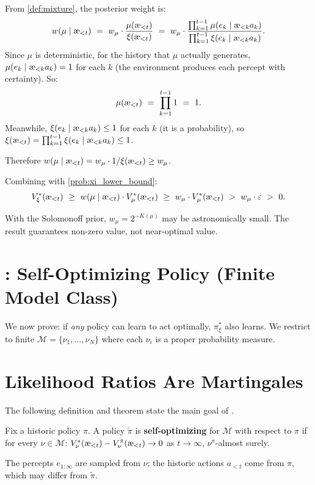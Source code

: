 \documentclass[fontsize=11pt, parskip=half]{scrartcl}
\newcommand{\cM}{\mathcal{M}}
\newcommand{\aes}{\textnormal{\ae}}
\begin{document}
\begin{solution}
From \cref{def:mixture}, the posterior weight is:
\[
    w(\mu \mid \aes_{<t})
    ~=~ w_\mu \cdot \frac{\mu(\aes_{<t})}{\xi(\aes_{<t})}
    ~=~ w_\mu \cdot \frac{\prod_{k=1}^{t-1} \mu(e_k \mid \aes_{<k} a_k)}{\prod_{k=1}^{t-1} \xi(e_k \mid \aes_{<k} a_k)}.
\]
Since $\mu$ is deterministic, for the history that $\mu$ actually generates, $\mu(e_k \mid \aes_{<k} a_k) = 1$ for each $k$ (the environment produces each percept with certainty). So:
\[
    \mu(\aes_{<t}) ~=~ \prod_{k=1}^{t-1} 1 ~=~ 1.
\]
Meanwhile, $\xi(e_k \mid \aes_{<k} a_k) \leq 1$ for each $k$ (it is a probability), so $\xi(\aes_{<t}) = \prod_{k=1}^{t-1} \xi(e_k \mid \aes_{<k} a_k) \leq 1$.

Therefore $w(\mu \mid \aes_{<t}) = w_\mu \cdot 1 / \xi(\aes_{<t}) \geq w_\mu$.

Combining with \cref{prob:xi_lower_bound}:
\[
    V_\xi^*(\aes_{<t})
    ~\geq~ w(\mu \mid \aes_{<t}) \cdot V_\mu^*(\aes_{<t})
    ~\geq~ w_\mu \cdot V_\mu^*(\aes_{<t})
    ~>~ w_\mu \cdot \varepsilon
    ~>~ 0.
\]
\end{solution}

\begin{remark}
With the Solomonoff prior, $w_\mu = 2^{-K(\mu)}$ may be astronomically small. The result guarantees non-zero value, not near-optimal value.
\end{remark}


\section*{: Self-Optimizing Policy (Finite Model Class)}

We now prove: if \emph{any} policy can learn to act optimally, $\pi_\xi^*$ also learns. We restrict to finite $\cM = \{\nu_1, \ldots, \nu_N\}$ where each $\nu_i$ is a proper probability measure.

\section{Likelihood Ratios Are Martingales}\label{prob:supermartingale}

The following definition and theorem state the main goal of .

\begin{definition}\label{def:selfopt}
Fix a historic policy $\pi$. A policy $\tilde\pi$ is \textbf{self-optimizing} for $\cM$ with respect to $\pi$ if for every $\nu \in \cM$:
$V_\nu^*(\aes_{<t}) - V_\nu^{\tilde\pi}(\aes_{<t}) \to 0$ as $t \to \infty$, $\nu^\pi$-almost surely.

The percepts $e_{1:\infty}$ are sampled from $\nu$; the historic actions $a_{<t}$ come from $\pi$, which may differ from $\tilde\pi$.
\end{definition}
\end{document}
